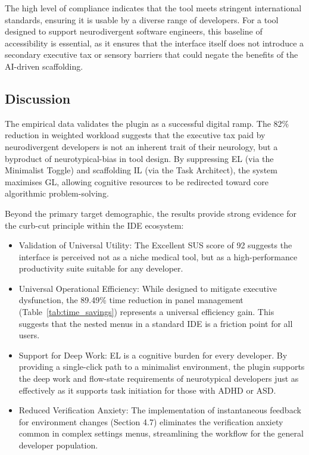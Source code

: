 The high level of compliance indicates that the tool meets stringent international standards, ensuring it is usable by a diverse range 
of developers. For a tool designed to support neurodivergent software engineers, this baseline of accessibility is essential, as it ensures 
that the interface itself does not introduce a secondary executive tax or sensory barriers that could negate the benefits of the \gls{AI}-driven scaffolding.

\subsection{Discussion}
The empirical data validates the plugin as a successful digital ramp. 
The 82\% reduction in weighted workload suggests that the executive tax paid by \gls{neurodivergent} developers
 is not an inherent trait of their neurology, but a byproduct of \gls{neurotypical-bias} in tool design. By suppressing \gls{EL} 
 (via the Minimalist Toggle) and \gls{scaffolding} \gls{IL} (via the Task Architect), the system maximises \gls{GL}, allowing 
 cognitive resources to be redirected toward core algorithmic problem-solving. 

Beyond the primary target demographic, the results provide strong evidence for the curb-cut principle within the \gls{IDE} ecosystem:
\begin{itemize}
    \item Validation of Universal Utility: The Excellent \gls{SUS} score of 92 suggests the interface is perceived not as a niche medical tool, but as a high-performance 
productivity suite suitable for any developer.
    \item Universal Operational Efficiency: While designed to mitigate executive dysfunction, the 89.49\% time reduction in panel management (Table~\ref{tab:time_savings}) 
    represents a universal efficiency gain. This suggests that the nested menus in a standard \gls{IDE} is a friction point for all users.
    \item Support for Deep Work: \gls{EL} is a cognitive burden for every developer. By providing a single-click path to a minimalist environment, 
the plugin supports the deep work and flow-state requirements of neurotypical developers just as effectively as it supports task initiation for those with \gls{ADHD} or \gls{ASD}.
    \item Reduced Verification Anxiety: The implementation of instantaneous feedback for environment changes (Section 4.7) eliminates the verification anxiety common in 
complex settings menus, streamlining the workflow for the general developer population. 
\end{itemize}

